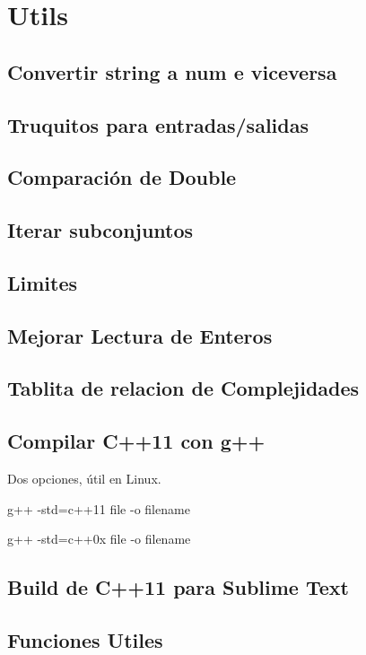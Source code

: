 \section{Utils}
\subsection{Convertir string a num e viceversa}

\newpage
\subsection{Truquitos para entradas/salidas}

\subsection{Comparaci\'on de Double}

\subsection{Iterar subconjuntos}

\subsection{Limites}

\newpage
\subsection{Mejorar Lectura de Enteros}

\subsection{Tablita de relacion de Complejidades}

\subsection{Compilar C++11 con g++}
Dos opciones, \'util en Linux.
\begin{code}
g++ -std=c++11 {file} -o {filename}

g++ -std=c++0x {file} -o {filename}
\end{code}
\subsection{Build de C++11 para Sublime Text}

\subsection{Funciones Utiles}


